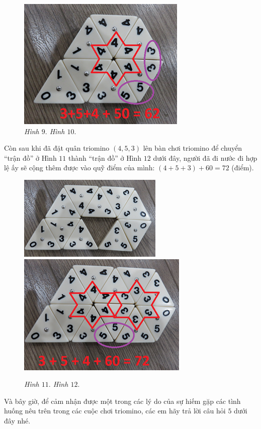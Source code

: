 {\begin{figure}[H]
		\includegraphics[height=0.3\textwidth]{h10a}
			\caption{\textit{\small Hình $9.$ \hspace*{75pt} Hình $10.$}}
	\end{figure}
	Còn sau khi đã đặt quân triomino $(4, 5, 3)$ lên bàn chơi triomino để chuyển “trận đồ” ở Hình $11$ thành “trận đồ” ở Hình $12$ dưới đây, người đã đi nước đi hợp lệ ấy sẽ cộng thêm được vào quỹ điểm của mình:
	\vskip 0.1cm
	\hspace*{40pt} $(4+5+3)+60=72$ (điểm).
	\vskip 0.1cm
	\begin{figure}[H]
		\centering
		\vspace*{-5pt}
		\captionsetup{labelformat=empty, justification=centering}
		\includegraphics[height=0.25\textwidth]{h11a}\quad
		\includegraphics[height=0.25\textwidth]{h12a}
		\caption{\textit{\small Hình $11.$ \hspace*{75pt} Hình $12.$}}
		\vspace*{-5pt}
	\end{figure}
	Và bây giờ, để cảm nhận được một trong các lý do của sự hiếm gặp các tình huống nêu trên trong các cuộc chơi triomino, các em hãy trả lời câu hỏi $5$ dưới đây nhé.
	\vskip 0.1cm
	\begin{multicols}{2}

\end{multicols}}
